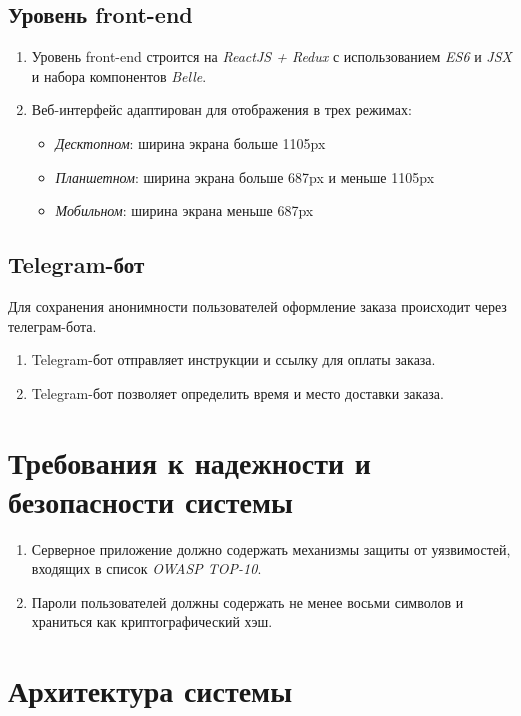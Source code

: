 \documentclass[12pt, a4paper]{article}
\begin{document}
\subsection{Уровень front-end}

\begin{enumerate}
\item Уровень front-end строится на \textit{ReactJS + Redux} 
  с использованием \textit{ES6} и \textit{JSX} и набора
  компонентов \textit{Belle}.
\item Веб-интерфейс адаптирован для отображения в трех режимах:
  \begin{itemize}
  \item \textit{Десктопном}: ширина экрана больше 1105px
  \item \textit{Планшетном}: ширина экрана больше 687px и меньше 1105px
  \item \textit{Мобильном}: ширина экрана меньше 687px
  \end{itemize}
\end{enumerate}

\subsection{Telegram-бот}
\label{telegram-bot}

Для сохранения анонимности пользователей оформление заказа происходит
через телеграм-бота.

\begin{enumerate}
\item Telegram-бот отправляет инструкции и ссылку для оплаты заказа.
\item Telegram-бот позволяет определить время и место доставки заказа.
\end{enumerate}

\section{Требования к надежности и безопасности системы}

\begin{enumerate}
\item Серверное приложение должно содержать механизмы защиты от
  уязвимостей, входящих в список \textit{OWASP TOP-10}.
\item Пароли пользователей должны содержать не менее восьми 
  символов и храниться как криптографический хэш.
\end{enumerate}

\section{Архитектура системы}
\end{document}
